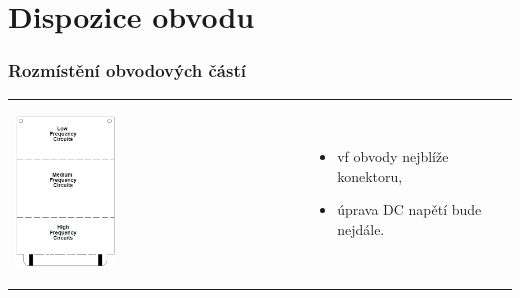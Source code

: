 \documentclass{beamer}
\begin{document}
\section{\texorpdfstring{Dispozice obvodu}{Dispozice obvodu}}
  \begin{frame}
    \frametitle{Rozmístění obvodových částí}
    
			\begin{tabular}{ p{55mm} p{55mm} }
				\begin{center}
					\includegraphics[width=0.35\textwidth]{obr/dispozice.png} 
				\end{center} &
				
				\begin{itemize}
					\item vf obvody nejblíže konektoru,
					\item úprava DC napětí bude nejdále.
				\end{itemize}
			\end{tabular}
    
  \end{frame}
\end{document}

